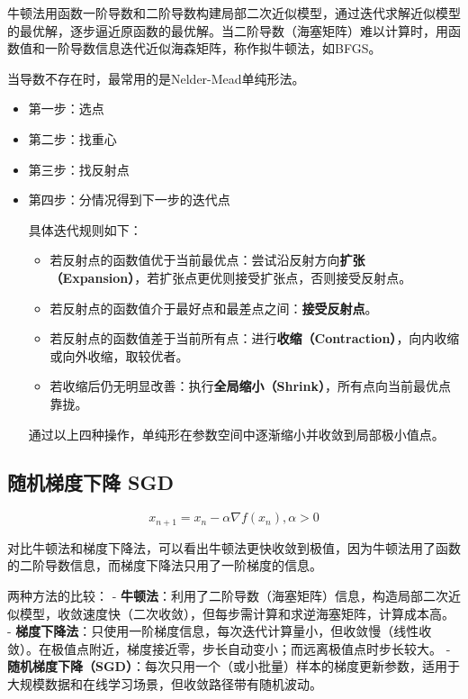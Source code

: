 \documentclass[
]{book}
\providecommand{\tightlist}{%
  \setlength{\itemsep}{0pt}\setlength{\parskip}{0pt}}
\begin{document}
牛顿法用函数一阶导数和二阶导数构建局部二次近似模型，通过迭代求解近似模型的最优解，逐步逼近原函数的最优解。当二阶导数（海塞矩阵）难以计算时，用函数值和一阶导数信息迭代近似海森矩阵，称作拟牛顿法，如BFGS。

当导数不存在时，最常用的是Nelder-Mead单纯形法。

\begin{itemize}
\item
  第一步：选点
\item
  第二步：找重心
\item
  第三步：找反射点
\item
  第四步：分情况得到下一步的迭代点

  具体迭代规则如下：

  \begin{itemize}
  \tightlist
  \item
    若反射点的函数值优于当前最优点：尝试沿反射方向\textbf{扩张（Expansion）}，若扩张点更优则接受扩张点，否则接受反射点。
  \item
    若反射点的函数值介于最好点和最差点之间：\textbf{接受反射点}。
  \item
    若反射点的函数值差于当前所有点：进行\textbf{收缩（Contraction）}，向内收缩或向外收缩，取较优者。
  \item
    若收缩后仍无明显改善：执行\textbf{全局缩小（Shrink）}，所有点向当前最优点靠拢。
  \end{itemize}

  通过以上四种操作，单纯形在参数空间中逐渐缩小并收敛到局部极小值点。
\end{itemize}

\subsection{随机梯度下降 SGD}\label{ux968fux673aux68afux5ea6ux4e0bux964d-sgd}

\[
x_{n+1} = x_n - \alpha \nabla f(x_n),\alpha >0
\]

对比牛顿法和梯度下降法，可以看出牛顿法更快收敛到极值，因为牛顿法用了函数的二阶导数信息，而梯度下降法只用了一阶梯度的信息。

两种方法的比较：
- \textbf{牛顿法}：利用了二阶导数（海塞矩阵）信息，构造局部二次近似模型，收敛速度快（二次收敛），但每步需计算和求逆海塞矩阵，计算成本高。
- \textbf{梯度下降法}：只使用一阶梯度信息，每次迭代计算量小，但收敛慢（线性收敛）。在极值点附近，梯度接近零，步长自动变小；而远离极值点时步长较大。
- \textbf{随机梯度下降（SGD）}：每次只用一个（或小批量）样本的梯度更新参数，适用于大规模数据和在线学习场景，但收敛路径带有随机波动。
\end{document}
